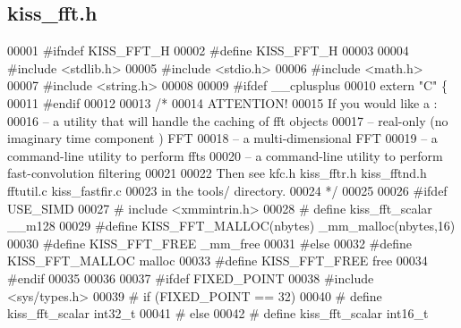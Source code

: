\subsection{kiss\+\_\+fft.\+h}
\label{kiss__fft_8h_source}

\begin{DoxyCode}
00001 \textcolor{preprocessor}{#ifndef KISS\_FFT\_H}
00002 \textcolor{preprocessor}{#define KISS\_FFT\_H}
00003 
00004 \textcolor{preprocessor}{#include <stdlib.h>}
00005 \textcolor{preprocessor}{#include <stdio.h>}
00006 \textcolor{preprocessor}{#include <math.h>}
00007 \textcolor{preprocessor}{#include <string.h>}
00008 
00009 \textcolor{preprocessor}{#ifdef \_\_cplusplus}
00010 \textcolor{keyword}{extern} \textcolor{stringliteral}{"C"} \{
00011 \textcolor{preprocessor}{#endif}
00012 
00013 \textcolor{comment}{/*}
00014 \textcolor{comment}{ ATTENTION!}
00015 \textcolor{comment}{ If you would like a :}
00016 \textcolor{comment}{ -- a utility that will handle the caching of fft objects}
00017 \textcolor{comment}{ -- real-only (no imaginary time component ) FFT}
00018 \textcolor{comment}{ -- a multi-dimensional FFT}
00019 \textcolor{comment}{ -- a command-line utility to perform ffts}
00020 \textcolor{comment}{ -- a command-line utility to perform fast-convolution filtering}
00021 \textcolor{comment}{}
00022 \textcolor{comment}{ Then see kfc.h kiss\_fftr.h kiss\_fftnd.h fftutil.c kiss\_fastfir.c}
00023 \textcolor{comment}{  in the tools/ directory.}
00024 \textcolor{comment}{*/}
00025 
00026 \textcolor{preprocessor}{#ifdef USE\_SIMD}
00027 \textcolor{preprocessor}{# include <xmmintrin.h>}
00028 \textcolor{preprocessor}{# define kiss\_fft\_scalar \_\_m128}
00029 \textcolor{preprocessor}{#define KISS\_FFT\_MALLOC(nbytes) \_mm\_malloc(nbytes,16)}
00030 \textcolor{preprocessor}{#define KISS\_FFT\_FREE \_mm\_free}
00031 \textcolor{preprocessor}{#else   }
00032 \textcolor{preprocessor}{#define KISS\_FFT\_MALLOC malloc}
00033 \textcolor{preprocessor}{#define KISS\_FFT\_FREE free}
00034 \textcolor{preprocessor}{#endif  }
00035 
00036 
00037 \textcolor{preprocessor}{#ifdef FIXED\_POINT}
00038 \textcolor{preprocessor}{#include <sys/types.h>}  
00039 \textcolor{preprocessor}{# if (FIXED\_POINT == 32)}
00040 \textcolor{preprocessor}{#  define kiss\_fft\_scalar int32\_t}
00041 \textcolor{preprocessor}{# else  }
00042 \textcolor{preprocessor}{#  define kiss\_fft\_scalar int16\_t}

\end{DoxyCode}
